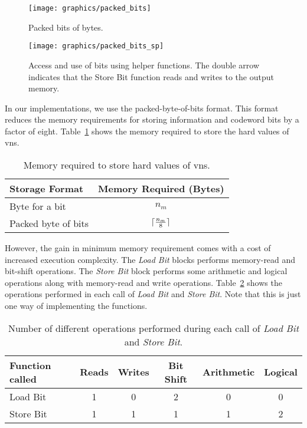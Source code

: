 \begin{enumerate}
  \begin{figure}[htbp]
    \centering
    \texttt{[image: graphics/packed\_bits]}
    \caption[Illustration of Packed-byte-of-bits storage format.]{Packed bits of bytes.}
    \label{fig:packed_bits}
  \end{figure}
  \begin{figure}[htbp]
    \centering
    \texttt{[image: graphics/packed\_bits\_sp]}
    \caption[Usage of bits stored in Packed-byte-of-bits format.]{Access and use of bits using helper functions. The double arrow indicates that the Store Bit function reads and writes to the output memory.}
    \label{fig:packed_spb}
  \end{figure}
\end{enumerate}
In our implementations, we use the packed-byte-of-bits format. This format reduces the memory requirements for storing information and codeword bits by a factor of eight. Table~\ref{tab:mem_req} shows the memory required to store the hard values of \glspl{vn}.
\begin{table}[htbp]
  \centering
  \begin{tabular}{|l|c|}
    \hline
    \textbf{Storage Format} &\textbf{Memory Required (Bytes)}\\
    \hline
    \hline
    Byte for a bit &$n_m$\\
    \hline
    Packed byte of bits &$\lceil\frac{n_m}{8}\rceil$\\
    \hline
  \end{tabular}
  \caption{Memory required to store hard values of \glspl{vn}.}
  \label{tab:mem_req}
\end{table}

However, the gain in minimum memory requirement comes with a cost of increased execution complexity. The \emph{Load Bit} blocks performs memory-read and bit-shift operations. The \emph{Store Bit} block performs some arithmetic and logical operations along with memory-read and write operations. Table~\ref{tab:load_store} shows the operations performed in each call of \emph{Load Bit} and \emph{Store Bit}. Note that this is just one way of implementing the functions.
\begin{table}[htbp]
  \centering
  \begin{tabular}{|l|c|c|c|c|c|}
    \hline
    \textbf{Function called} &\textbf{Reads} &\textbf{Writes} &\textbf{Bit Shift} &\textbf{Arithmetic} &\textbf{Logical}\\
    \hline
    \hline
    Load Bit &1 &0 &2 &0 &0\\
    \hline
    Store Bit &1 &1 &1 &1 &2\\
    \hline
  \end{tabular}
  \caption[Operations performed for different storage formats.]{Number of different operations performed during each call of \emph{Load Bit} and \emph{Store Bit}.}
  \label{tab:load_store}
\end{table}


